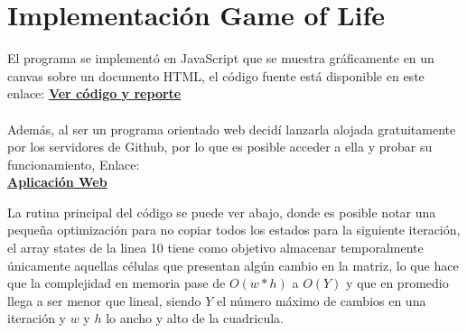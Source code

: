 \chapter{Implementación Game of Life}


El programa se implementó en JavaScript que se muestra gráficamente en un canvas sobre un documento HTML, el código fuente está disponible en este enlace:
 \href{https://github.com/QApolo/CS/tree/master/03_Conway}{\textbf{Ver código y reporte}}
 \\\\
 Además, al ser un programa orientado web decidí lanzarla alojada gratuitamente por los servidores de Github,  por lo que es posible  acceder a ella y probar su funcionamiento, Enlace: \\ \href{https://qapolo.github.io/03_Conway/index.html}{\textbf{Aplicación Web}}
 
La rutina principal del código se puede ver abajo, donde es posible notar una pequeña optimización para no copiar todos los estados para la siguiente iteración, el array states de la linea 10 tiene como objetivo almacenar temporalmente únicamente aquellas células que presentan algún cambio en la matriz, lo que hace que la complejidad en memoria pase de \textbf{$O(w*h)$} a \textbf{$O(Y)$}  y que en promedio llega a ser menor que lineal, siendo $Y$ el número máximo de cambios en una iteración y $w$ y $h$ lo ancho y alto de la cuadricula.\\\\

